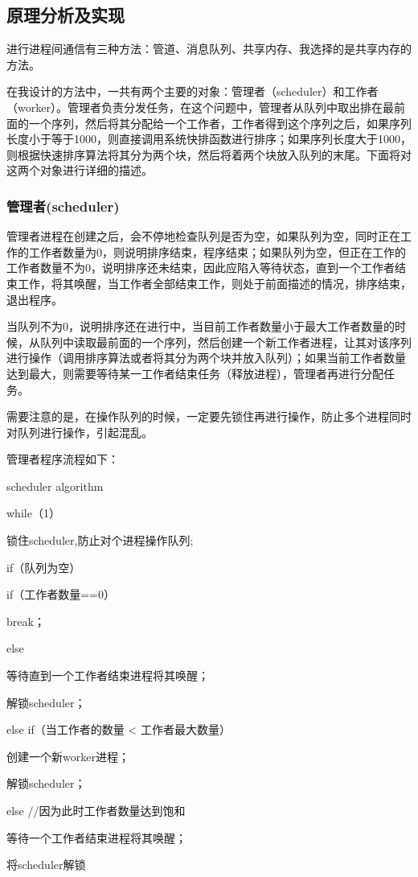 \documentclass[UTF8]{ctexart}
\begin{document}
\subsection{原理分析及实现}
进行进程间通信有三种方法：管道、消息队列、共享内存、我选择的是共享内存的方法。\par
在我设计的方法中，一共有两个主要的对象：管理者（scheduler）和工作者（worker）。管理者负责分发任务，在这个问题中，管理者从队列中取出排在最前面的一个序列，然后将其分配给一个工作者，工作者得到这个序列之后，如果序列长度小于等于1000，则直接调用系统快排函数进行排序；如果序列长度大于1000，则根据快速排序算法将其分为两个块，然后将着两个块放入队列的末尾。下面将对这两个对象进行详细的描述。\par
\subsubsection{管理者(scheduler)}
管理者进程在创建之后，会不停地检查队列是否为空，如果队列为空，同时正在工作的工作者数量为0，则说明排序结束，程序结束；如果队列为空，但正在工作的工作者数量不为0，说明排序还未结束，因此应陷入等待状态，直到一个工作者结束工作，将其唤醒，当工作者全部结束工作，则处于前面描述的情况，排序结束，退出程序。\par
当队列不为0，说明排序还在进行中，当目前工作者数量小于最大工作者数量的时候，从队列中读取最前面的一个序列，然后创建一个新工作者进程，让其对该序列进行操作（调用排序算法或者将其分为两个块并放入队列）；如果当前工作者数量达到最大，则需要等待某一工作者结束任务（释放进程），管理者再进行分配任务。\par
需要注意的是，在操作队列的时候，一定要先锁住再进行操作，防止多个进程同时对队列进行操作，引起混乱。\par
管理者程序流程如下：\par
\begin{algorithm}
\caption{scheduler algorithm}
\begin{algorithmic}[1]
\STATE while（1）\par
\STATE	\qquad 锁住scheduler,防止对个进程操作队列;\par
\STATE	\qquad if（队列为空）	\par
\STATE	\qquad\qquad if（工作者数量==0）	\par
\STATE	\qquad\qquad\qquad break；	\par
\STATE \qquad \qquad else \par
\STATE	\qquad\qquad\qquad 等待直到一个工作者结束进程将其唤醒；\par
\STATE	\qquad\qquad \qquad 解锁scheduler；\par
\STATE	\qquad else if（当工作者的数量 < 工作者最大数量）\par
\STATE	\qquad\qquad 创建一个新worker进程；\par
\STATE	\qquad\qquad 解锁scheduler；\par 
\STATE	\qquad else \qquad //因为此时工作者数量达到饱和\par
\STATE	\qquad\qquad 等待一个工作者结束进程将其唤醒；\par
\STATE	\qquad \qquad 将scheduler解锁\par
\end{algorithmic}
\end{algorithm}
\end{document}
